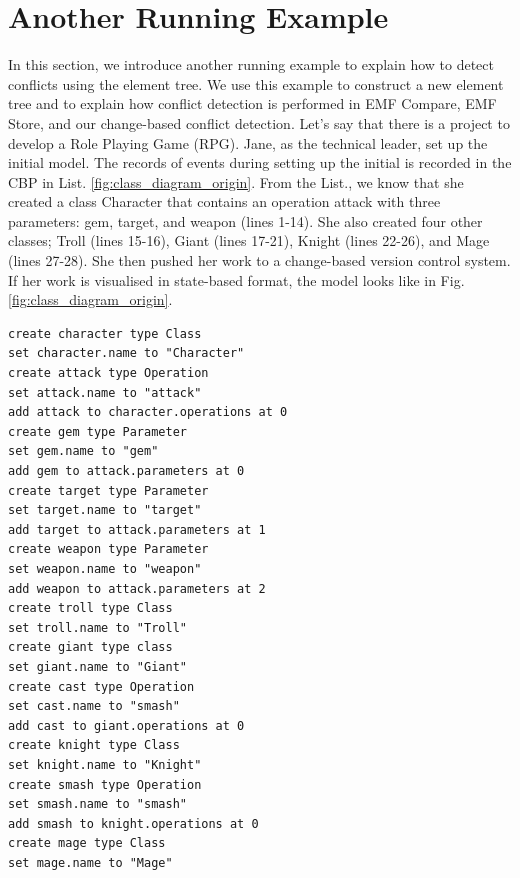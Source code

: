 \section{Another Running Example}
\label{sec:another_running_example}
In this section, we introduce another running example to explain how to detect conflicts using the element tree. We use this example to construct a new element tree and to explain how conflict detection is performed in EMF Compare, EMF Store, and our change-based conflict detection. Let's say that there is a project to develop a Role Playing Game (RPG). Jane, as the technical leader, set up the initial model. The records of events during setting up the initial is recorded in the CBP in List. \ref{fig:class_diagram_origin}. From the List., we know that she created a class \textsf{Character} that contains an operation \textsf{attack} with three parameters: \textsf{gem}, \textsf{target}, and \textsf{weapon} (lines 1-14). She also created four other classes; \textsf{Troll} (lines 15-16), \textsf{Giant} (lines 17-21), \textsf{Knight} (lines 22-26), and \textsf{Mage} (lines 27-28). She then pushed her work to a change-based version control system. If her work is visualised in state-based format, the model looks like in Fig. \ref{fig:class_diagram_origin}.

\begin{lstlisting}[firstnumber=1,style=eol,caption={The recorded events to produce the original model in Fig. \ref{fig:class_diagram_origin} (original version).},label=lst:cbp_origin]
create character type Class
set character.name to "Character" 
create attack type Operation
set attack.name to "attack" 
add attack to character.operations at 0
create gem type Parameter
set gem.name to "gem" 
add gem to attack.parameters at 0
create target type Parameter
set target.name to "target" 
add target to attack.parameters at 1
create weapon type Parameter
set weapon.name to "weapon" 
add weapon to attack.parameters at 2
create troll type Class
set troll.name to "Troll" 
create giant type class
set giant.name to "Giant"
create cast type Operation
set cast.name to "smash"
add cast to giant.operations at 0
create knight type Class
set knight.name to "Knight"
create smash type Operation
set smash.name to "smash"
add smash to knight.operations at 0
create mage type Class
set mage.name to "Mage" 
\end{lstlisting}

